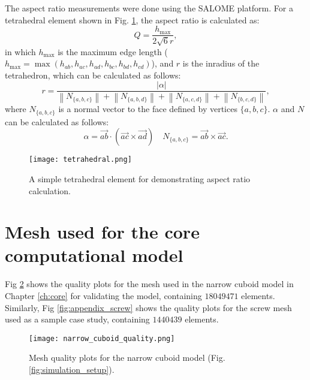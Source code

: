 The aspect ratio measurements were done using the SALOME platform. For a  tetrahedral element shown in Fig. \ref{fig:appendix_tetrahedral}, the aspect ratio is calculated as:
\begin{equation}
Q=\frac{h_{\max }}{2 \sqrt{6} r},
\end{equation}
in which $h_{\max}$ is the maximum edge length ($h_{\max }=\max \left(h_{a b}, h_{a c}, h_{a d}, h_{b c}, h_{b d}, h_{c d}\right)$), and $r$ is the inradius of the tetrahedron, which can be calculated as follows: 
\begin{equation}
r=\frac{|\alpha|}{\left\|N_{\{a, b, c\}}\right\|+\left\|N_{\{a, b, d\}}\right\|+\left\|N_{\{a, c, d\}}\right\|+\left\|N_{\{b, c, d\}}\right\|},
\end{equation} 
where $N_{\{a, b, c\}}$ is a normal vector to the face defined by vertices $\{a, b, c\}$. $\alpha$ and $N$ can be calculated as follows:
\begin{equation}
\alpha=\overrightarrow{a b} \cdot(\overrightarrow{a c} \times \overrightarrow{a d}) \quad N_{\{a, b, c\}}=\overrightarrow{a b} \times \overrightarrow{a c}.
\end{equation}


\begin{figure}[h]
\centering
\medskip
\texttt{[image: tetrahedral.png]}
\caption[A simple tetrahedral element for demonstrating aspect ratio calculation]{A simple tetrahedral element for demonstrating aspect ratio calculation.} \label{fig:appendix_tetrahedral}
\end{figure}


\section{Mesh used for the core computational model}

Fig \ref{fig:appendix_narrow_cuboid} shows the quality plots for the mesh used in the narrow cuboid model in Chapter \ref{ch:core} for validating the model, containing $\num{18049471}$ elements. Similarly, Fig \ref{fig:appendix_screw} shows the quality plots for the screw mesh used as a sample case study, containing $\num{1440439}$ elements.

\begin{figure}[h]
\centering
\medskip
\texttt{[image: narrow\_cuboid\_quality.png]}
\caption[Mesh quality plots for the narrow cuboid model]{Mesh quality plots for the narrow cuboid model (Fig. \ref{fig:simulation_setup}).} \label{fig:appendix_narrow_cuboid}
\end{figure}


